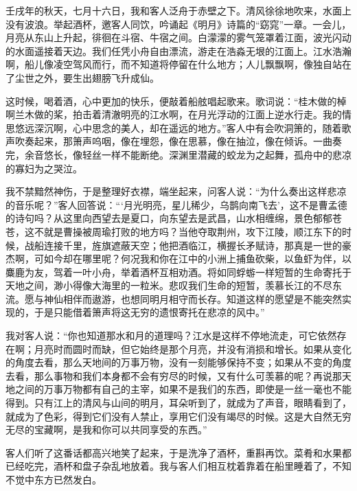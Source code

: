 \documentclass[12pt,UTF-8,openany]{ctexbook}
\begin{document}
\begin{normalsize}
    
    壬戌年的秋天，七月十六日，我和客人泛舟于赤壁之下。清风徐徐地吹来，水面上没有波浪。举起酒杯，邀客人同饮，吟诵起《明月》诗篇的“窈窕”一章。一会儿，月亮从东山上升起，徘徊在斗宿、牛宿之间。白濛濛的雾气笼罩着江面，波光闪动的水面遥接着天边。我们任凭小舟自由漂流，游走在浩淼无垠的江面上。江水浩瀚啊，船儿像凌空驾风而行，而不知道将停留在什么地方；人儿飘飘啊，像独自站在了尘世之外，要生出翅膀飞升成仙。
    
    这时候，喝着酒，心中更加的快乐，便敲着船舷唱起歌来。歌词说：“桂木做的棹啊兰木做的桨，拍击着清澈明亮的江水啊，在月光浮动的江面上逆水行走。我的情思悠远深沉啊，心中思念的美人，却在遥远的地方。”客人中有会吹洞箫的，随着歌声吹奏起来，那箫声呜咽，像在埋怨，像在思慕，像在抽泣，像在倾诉。一曲奏完，余音悠长，像轻丝一样不能断绝。深渊里潜藏的蛟龙为之起舞，孤舟中的悲凉的寡妇为之哭泣。
    
    我不禁黯然神伤，于是整理好衣襟，端坐起来，问客人说：“为什么奏出这样悲凉的音乐呢？”客人回答说：“‘月光明亮，星儿稀少，乌鹊向南飞去’，这不是曹孟德的诗句吗？从这里向西望去是夏口，向东望去是武昌，山水相缠绵，景色郁郁苍苍，这不就是曹操被周瑜打败的地方吗？当他夺取荆州，攻下江陵，顺江东下的时候，战船连接千里，旌旗遮蔽天空；他把酒临江，横握长矛赋诗，那真是一世的豪杰啊，可如今却在哪里呢？何况我和你在江中的小洲上捕鱼砍柴，以鱼虾为伴，以麋鹿为友，驾着一叶小舟，举着酒杯互相劝酒。将如同蜉蝣一样短暂的生命寄托于天地之间，渺小得像大海里的一粒米。悲叹我们生命的短暂，羡慕长江的不尽东流。愿与神仙相伴而遨游，也想同明月相守而长存。知道这样的愿望是不能突然实现的，于是只能借着箫声将这无穷的遗恨寄托在悲凉的风中。”
    
    我对客人说：“你也知道那水和月的道理吗？江水是这样不停地流走，可它依然存在啊；月亮时而圆时而缺，但它始终是那个月亮，并没有消损和增长。如果从变化的角度去看，那么天地间的万事万物，没有一刻能够保持不变；如果从不变的角度去看，那么事物和我们本身都不会有穷尽的时候，又有什么可羡慕的呢？再说那天地之间的万事万物都有自己的主宰，如果不是我们的东西，即使是一丝一毫也不能得到。只有江上的清风与山间的明月，耳朵听到了，就成为了声音，眼睛看到了，就成为了色彩，得到它们没有人禁止，享用它们没有竭尽的时候。这是大自然无穷无尽的宝藏啊，是我和你可以共同享受的东西。”
    
    客人们听了这番话都高兴地笑了起来，于是洗净了酒杯，重斟再饮。菜肴和水果都已经吃完，酒杯和盘子杂乱地放着。我与客人们相互枕着靠着在船里睡着了，不知不觉中东方已然发白。
    
\end{normalsize}
\end{document}
